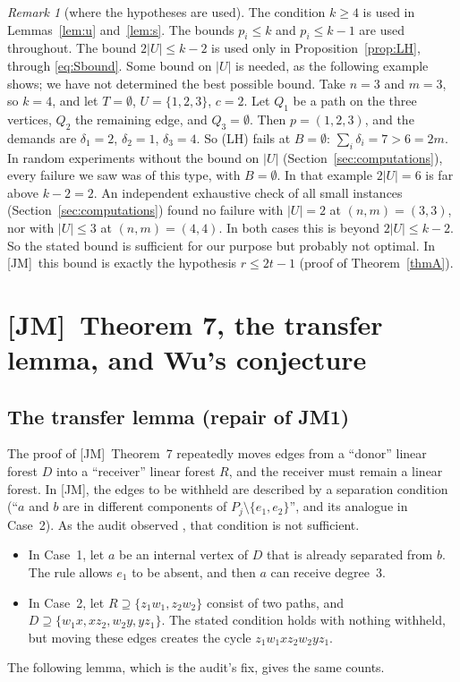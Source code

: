 \documentclass[11pt]{amsart}
\theoremstyle{definition}
\theoremstyle{remark}
\newtheorem{remark}[theorem]{Remark}
\newcommand{\JM}{\textup{[JM]}}
\begin{document}
\begin{remark}[where the hypotheses are used]\label{rem:sharp}
The condition $k\ge4$ is used in Lemmas~\ref{lem:u} and~\ref{lem:s}. The bounds $p_i\le k$ and
$p_i\le k-1$ are used throughout. The bound $2|U|\le k-2$ is used only in
Proposition~\ref{prop:LH}, through \eqref{eq:Sbound}. Some bound on $|U|$ is needed, as
the following example shows; we have not determined the best possible bound. Take
$n=3$ and $m=3$, so $k=4$, and let $T=\emptyset$, $U=\{1,2,3\}$, $c=2$. Let $Q_1$ be a path on
the three vertices, $Q_2$ the remaining edge, and $Q_3=\emptyset$. Then $p=(1,2,3)$, and the
demands are $\delta_1=2$, $\delta_2=1$, $\delta_3=4$. So (LH) fails at $B=\emptyset$:
$\sum_i\delta_i=7>6=2m$. In random experiments without the bound on $|U|$
(Section~\ref{sec:computations}), every failure we saw was of this type, with
$B=\emptyset$. In that example $2|U|=6$ is far above $k-2=2$. An independent exhaustive check
of all small instances (Section~\ref{sec:computations}) found no failure with $|U|=2$ at
$(n,m)=(3,3)$, nor with $|U|\le3$ at $(n,m)=(4,4)$. In both cases this is beyond
$2|U|\le k-2$. So the stated bound is sufficient for our purpose but probably not optimal. In
\JM\ this bound is exactly the hypothesis $r\le 2t-1$ (proof of Theorem~\ref{thmA}).
\end{remark}

\section{\JM\ Theorem 7, the transfer lemma, and Wu's conjecture}\label{sec:thm7}

\subsection{The transfer lemma (repair of JM1)}
The proof of \JM\ Theorem~7 repeatedly moves edges from a ``donor'' linear forest $D$ into a
``receiver'' linear forest $R$, and the receiver must remain a linear forest. In \JM, the edges
to be withheld are described by a separation condition (``$a$ and $b$ are in different
components of $P_j\setminus\{e_1,e_2\}$'', and its analogue in Case~2). As the audit observed
\cite[\S2.3]{A4}, that condition is not sufficient.
\begin{itemize}[leftmargin=*]
\item In Case~1, let $a$ be an internal vertex of $D$ that is already separated from $b$. The
rule allows $e_1$ to be absent, and then $a$ can receive degree~$3$.
\item In Case~2, let $R\supseteq\{z_1w_1,z_2w_2\}$ consist of two paths, and
$D\supseteq\{w_1x,xz_2,w_2y,yz_1\}$. The stated condition holds with nothing withheld, but
moving these edges creates the cycle $z_1w_1xz_2w_2yz_1$.
\end{itemize}
The following lemma, which is the audit's fix, gives the same counts.
\end{document}

